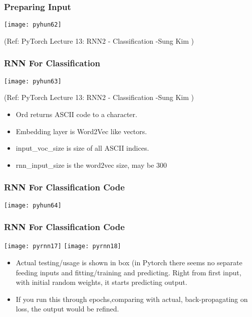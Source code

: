 \begin{frame}[fragile] \frametitle{Preparing Input}

\begin{center}
\texttt{[image: pyhun62]}

\tiny{(Ref:  PyTorch Lecture 13: RNN2 - Classification -Sung Kim )}
\end{center}


\end{frame}

\begin{frame}[fragile] \frametitle{RNN For Classification}

\begin{center}
\texttt{[image: pyhun63]}

\tiny{(Ref:  PyTorch Lecture 13: RNN2 - Classification -Sung Kim )}
\end{center}

\begin{itemize}
\item Ord returns ASCII code to a character. 
\item Embedding layer is Word2Vec like vectors.
\item input\_voc\_size is size of all ASCII indices.
\item rnn\_input\_size is the word2vec size, may be 300
\end{itemize}
\end{frame}


\begin{frame}[fragile] \frametitle{RNN For Classification Code}
\begin{center}
\texttt{[image: pyhun64]}
\end{center}
\end{frame}

\begin{frame}[fragile] \frametitle{RNN For Classification Code}
\begin{center}
\texttt{[image: pyrnn17]}
\texttt{[image: pyrnn18]}
\end{center}
\begin{itemize}
\item Actual testing/usage is shown in box (in Pytorch there seems no separate feeding inputs and fitting/training and predicting. Right from first input, with initial random weights, it starts predicting output.
\item If you run this through epochs,comparing with actual, back-propagating on loss, the output would be refined.
\end{itemize}

\end{frame}

